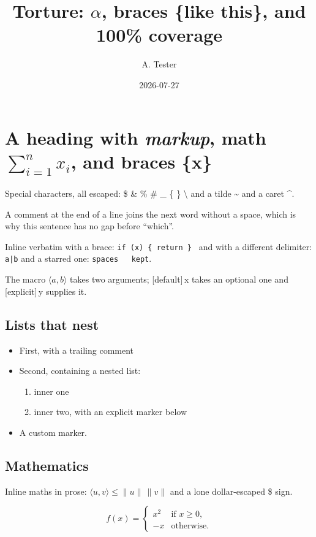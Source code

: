 \documentclass[11pt,twoside]{article}
\title{Torture: \texorpdfstring{$\alpha$}{alpha}, braces \{like this\}, and 100\% coverage}
\author{A. Tester}
\date{2026-07-27}
\newcommand{\pair}[2]{\ensuremath{\langle #1, #2 \rangle}}
\newcommand{\opt}[2][default]{[#1]\,#2}
\theoremstyle{plain}
\theoremstyle{definition}
\begin{document}
\maketitle

\section[Short form]{A heading with \emph{markup}, math $\sum_{i=1}^{n} x_i$, and braces \{x\}}
\label{sec:first}

Special characters, all escaped: \$ \& \% \# \_ \{ \} \textbackslash{} and a
tilde \~{} and a caret \^{}.

A comment at the end of a line joins the next word without a space,%
which is why this sentence has no gap before ``which''.

Inline verbatim with a brace: \verb|if (x) { return } | and with a different
delimiter: \verb+a|b+ and a starred one: \verb*!spaces   kept!.

The macro \pair{a}{b} takes two arguments; \opt{x} takes an optional one and
\opt[explicit]{y} supplies it.

\subsection{Lists that nest}

\begin{itemize}
  \item First, with a trailing comment%
  \item Second, containing a nested list:
  \begin{enumerate}[label=(\alph*)]
    \item inner one
    \item inner two, with an explicit marker below
  \end{enumerate}
  \item[!] A custom marker.
\end{itemize}

\subsection{Mathematics}

Inline maths in prose: $\pair{u}{v} \leq \|u\|\,\|v\|$ and a lone
dollar-escaped \$ sign.

\begin{equation}\label{eq:cases}
  f(x) =
  \begin{cases}
    x^2 & \text{if } x \geq 0, \\
    -x  & \text{otherwise.}
  \end{cases}
\end{equation}
\end{document}
